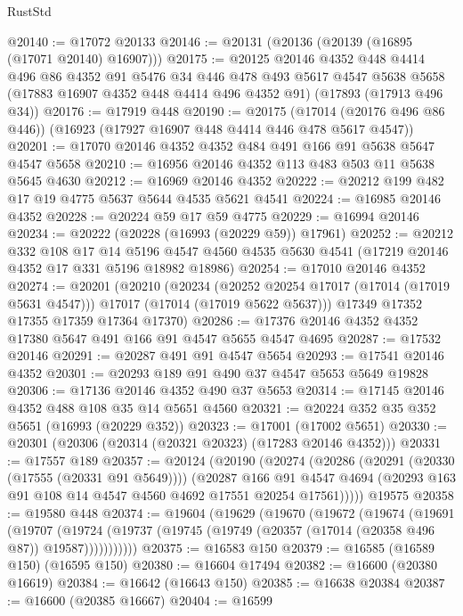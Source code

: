 \begin{lexlean}{RustStd}
\begin{coremodule}
{\begin{coremodule}
{{{{{{{{{{{{{{{{{{{{{{{{{{{{{{{{{{{{{{{{{{{{{{{{{{{{{{{@20140 := @17072 @20133
@20146 := @20131 (@20136 (@20139 (@16895 (@17071 @20140) @16907)))
@20175 := @20125
    @20146
    @4352
    @448
    @4414
    @496
    @86
    @4352
    @91
    @5476
    @34
    @446
    @478
    @493
    @5617
    @4547
    @5638
    @5658
    (@17883 @16907 @4352 @448 @4414 @496 @4352 @91)
    (@17893 (@17913 @496 @34))
@20176 := @17919 @448
@20190 := @20175
    (@17014 (@20176 @496 @86 @446))
    (@16923 (@17927 @16907 @448 @4414 @446 @478 @5617 @4547))
@20201 := @17070 @20146 @4352 @4352 @484 @491 @166 @91 @5638 @5647 @4547 @5658
@20210 := @16956 @20146 @4352 @113 @483 @503 @11 @5638 @5645 @4630
@20212 := @16969 @20146 @4352
@20222 := @20212 @199 @482 @17 @19 @4775 @5637 @5644 @4535 @5621 @4541
@20224 := @16985 @20146 @4352
@20228 := @20224 @59 @17 @59 @4775
@20229 := @16994 @20146
@20234 := @20222 (@20228 (@16993 (@20229 @59)) @17961)
@20252 := @20212
    @332
    @108
    @17
    @14
    @5196
    @4547
    @4560
    @4535
    @5630
    @4541
    (@17219 @20146 @4352 @17 @331 @5196 @18982 @18986)
@20254 := @17010 @20146 @4352
@20274 := @20201
    (@20210
      (@20234
        (@20252 @20254 @17017 (@17014 (@17019 @5631 @4547)))
        @17017
        (@17014 (@17019 @5622 @5637)))
      @17349
      @17352
      @17355
      @17359
      @17364
      @17370)
@20286 := @17376 @20146 @4352 @4352 @17380 @5647 @491 @166 @91 @4547 @5655 @4547 @4695
@20287 := @17532 @20146
@20291 := @20287 @491 @91 @4547 @5654
@20293 := @17541 @20146 @4352
@20301 := @20293 @189 @91 @490 @37 @4547 @5653 @5649 @19828
@20306 := @17136 @20146 @4352 @490 @37 @5653
@20314 := @17145 @20146 @4352 @488 @108 @35 @14 @5651 @4560
@20321 := @20224 @352 @35 @352 @5651 (@16993 (@20229 @352))
@20323 := @17001 (@17002 @5651)
@20330 := @20301 (@20306 (@20314 (@20321 @20323) (@17283 @20146 @4352)))
@20331 := @17557 @189
@20357 := @20124
    (@20190
      (@20274
        (@20286
          (@20291 (@20330 (@17555 (@20331 @91 @5649))))
          (@20287
            @166
            @91
            @4547
            @4694
            (@20293 @163 @91 @108 @14 @4547 @4560 @4692 @17551 @20254 @17561)))))
    @19575
@20358 := @19580 @448
@20374 := @19604
    (@19629
      (@19670
        (@19672
          (@19674
            (@19691
              (@19707
                (@19724 (@19737 (@19745 (@19749 (@20357 (@17014 (@20358 @496 @87)) @19587)))))))))))
@20375 := @16583 @150
@20379 := @16585 (@16589 @150) (@16595 @150)
@20380 := @16604 @17494
@20382 := @16600 (@20380 @16619)
@20384 := @16642 (@16643 @150)
@20385 := @16638 @20384
@20387 := @16600 (@20385 @16667)
@20404 := @16599
}}}}}}}}}}}}}}}}}}}}}}}}}}}}}}}}}}}}}}}}}}}}}}}}}}}}}}}
\end{coremodule}}
\end{coremodule}
\end{lexlean}
